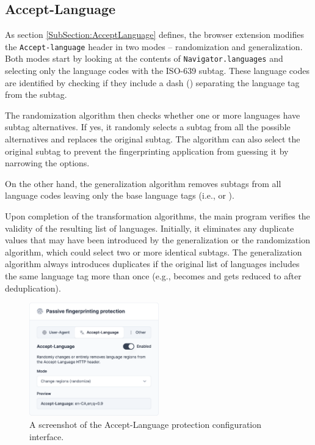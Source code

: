 
\subsection{Accept-Language}

As section \ref{SubSection:AcceptLanguage} defines, the browser extension modifies the \texttt{Accept-language} header in two modes -- randomization and generalization. Both modes start by looking at the contents of \texttt{Navigator.languages} and selecting only the language codes with the ISO-639 subtag. These language codes are identified by checking if they include a dash (\uv{-}) separating the language tag from the subtag.

The randomization algorithm then checks whether one or more languages have subtag alternatives. If yes, it randomly selects a subtag from all the possible alternatives and replaces the original subtag. The algorithm can also select the original subtag to prevent the fingerprinting application from guessing it by narrowing the options.

On the other hand, the generalization algorithm removes subtags from all language codes leaving only the base language tags (i.e.,  or ).

Upon completion of the transformation algorithms, the main program verifies the validity of the resulting list of languages. Initially, it eliminates any duplicate values that may have been introduced by the generalization or the randomization algorithm, which could select two or more identical subtags. The generalization algorithm always introduces duplicates if the original list of languages includes the same language tag more than once (e.g.,  becomes  and gets reduced to  after deduplication).

\begin{figure}[H]
    \centering
    \includegraphics[width=0.5\textwidth]{obrazky-figures/screenshot-accept-language}
    \caption{A screenshot of the Accept-Language protection configuration interface.}
\end{figure}

